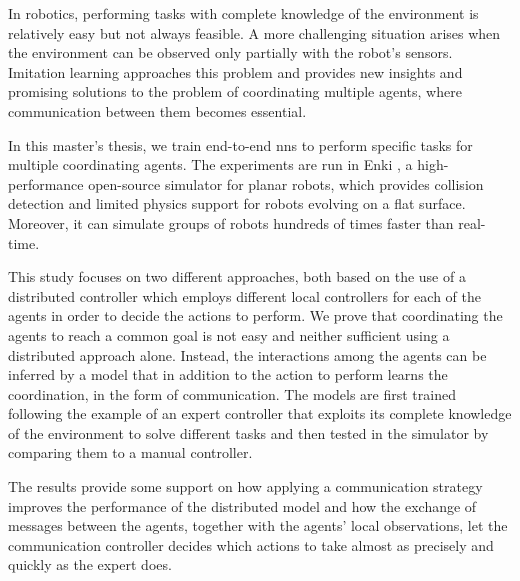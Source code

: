 In robotics, performing tasks with complete knowledge of the environment is 
relatively easy but not always feasible. A more challenging situation arises 
when the environment can be observed only partially with the robot's sensors. 
Imitation learning approaches this problem and provides new insights and 
promising solutions to the problem of coordinating multiple agents, where
communication between them becomes essential.

In this master's thesis, we train end-to-end \glspl{nn} to perform specific 
tasks for multiple coordinating agents. The experiments are run in Enki 
\cite[][]{enki}, a high-performance open-source simulator for planar robots, 
which provides collision detection and limited physics support for robots evolving 
on a flat surface. Moreover, it can simulate groups of robots hundreds of times 
faster than real-time.

This study focuses on two different approaches, both based on the use of a 
distributed controller which employs different local controllers for each of the 
agents in order to decide the actions to perform. 
We prove that coordinating the agents to reach a common goal is not easy and 
neither sufficient using a distributed approach alone. Instead, the interactions 
among the agents can be inferred by a model that in addition to the action to 
perform learns the coordination, in the form of communication. 
The models are first trained following the example of an expert controller that 
exploits its complete knowledge of the environment to solve different tasks and 
then tested in the simulator by comparing them to a manual controller.

The results provide some support on how applying a communication 
strategy improves the performance of the distributed model and how the 
exchange of messages between the agents, together with the agents' local 
observations, let the communication controller decides which actions to take 
almost as precisely and quickly as the expert does.
